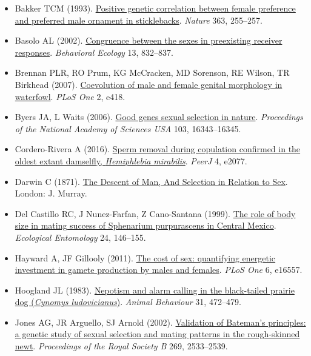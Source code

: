 \documentclass[
]{book}
\begin{document}
\begin{itemize}
\item
  Bakker TCM (1993). \href{https://www.nature.com/articles/363255a0}{Positive genetic correlation between female preference and preferred male ornament in sticklebacks}. \emph{Nature} 363, 255--257.
\item
  Basolo AL (2002). \href{https://academic.oup.com/beheco/article/13/6/832/196482}{Congruence between the sexes in preexisting receiver responses}. \emph{Behavioral Ecology} 13, 832--837.
\item
  Brennan PLR, RO Prum, KG McCracken, MD Sorenson, RE Wilson, TR Birkhead (2007). \href{https://journals.plos.org/plosone/article?id=10.1371/journal.pone.0000418}{Coevolution of male and female genital morphology in waterfowl}. \emph{PLoS One} 2, e418.
\item
  Byers JA, L Waits (2006). \href{https://www.pnas.org/content/103/44/16343}{Good genes sexual selection in nature}. \emph{Proceedings of the National Academy of Sciences USA} 103, 16343--16345.
\item
  Cordero-Rivera A (2016). \href{https://peerj.com/articles/2077/}{Sperm removal during copulation confirmed in the oldest extant damselfly, \emph{Hemiphlebia mirabilis}}. \emph{PeerJ} 4, e2077.
\item
  Darwin C (1871). \href{http://darwin-online.org.uk/content/frameset?pageseq=1\&itemID=F937.1\&viewtype=image}{The Descent of Man, And Selection in Relation to Sex}. London: J. Murray.
\item
  Del Castillo RC, J Nunez-Farfan, Z Cano-Santana (1999). \href{https://onlinelibrary.wiley.com/doi/abs/10.1046/j.1365-2311.1999.00188.x}{The role of body size in mating success of Sphenarium purpurascens in Central Mexico}. \emph{Ecological Entomology} 24, 146--155.
\item
  Hayward A, JF Gillooly (2011). \href{https://journals.plos.org/plosone/article?id=10.1371/journal.pone.0016557}{The cost of sex: quantifying energetic investment in gamete production by males and females}. \emph{PLoS One} 6, e16557.
\item
  Hoogland JL (1983). \href{https://www.sciencedirect.com/science/article/abs/pii/S0003347283800682}{Nepotism and alarm calling in the black-tailed prairie dog (\emph{Cynomys ludovicianus})}. \emph{Animal Behaviour} 31, 472--479.
\item
  Jones AG, JR Arguello, SJ Arnold (2002). \href{https://royalsocietypublishing.org/doi/10.1098/rspb.2002.2177}{Validation of Bateman's principles: a genetic study of sexual selection and mating patterns in the rough-skinned newt}. \emph{Proceedings of the Royal Society B} 269, 2533--2539.

\end{itemize}
\end{document}
